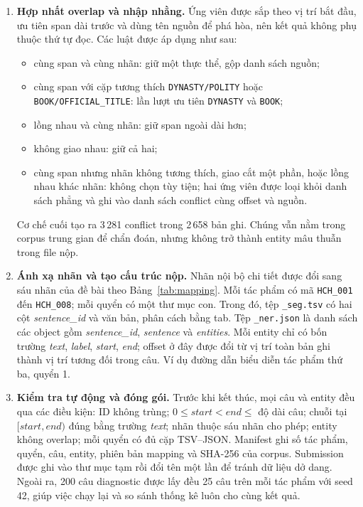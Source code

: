 \documentclass[11pt,a4paper]{article}
\begin{document}
\begin{enumerate}
  \item \textbf{Hợp nhất overlap và nhập nhằng.} Ứng viên được sắp theo vị trí
  bắt đầu, ưu tiên span dài trước và dùng tên nguồn để phá hòa, nên kết quả
  không phụ thuộc thứ tự đọc. Các luật được áp dụng như sau:
  \begin{itemize}
    \item cùng span và cùng nhãn: giữ một thực thể, gộp danh sách nguồn;
    \item cùng span với cặp tương thích \texttt{DYNASTY/POLITY} hoặc
    \texttt{BOOK/OFFICIAL\_TITLE}: lần lượt ưu tiên \texttt{DYNASTY} và
    \texttt{BOOK};
    \item lồng nhau và cùng nhãn: giữ span ngoài dài hơn;
    \item không giao nhau: giữ cả hai;
    \item cùng span nhưng nhãn không tương thích, giao cắt một phần, hoặc lồng
    nhau khác nhãn: không chọn tùy tiện; hai ứng viên được loại khỏi danh sách
    phẳng và ghi vào danh sách conflict cùng offset và nguồn.
  \end{itemize}
  Cơ chế cuối tạo ra 3\,281 conflict trong 2\,658 bản ghi. Chúng vẫn nằm trong
  corpus trung gian để chẩn đoán, nhưng không trở thành entity mâu thuẫn trong
  file nộp.

  \item \textbf{Ánh xạ nhãn và tạo cấu trúc nộp.} Nhãn nội bộ chi tiết được đổi
  sang sáu nhãn của đề bài theo Bảng~\ref{tab:mapping}. Mỗi tác phẩm có mã
  \texttt{HCH\_001} đến \texttt{HCH\_008}; mỗi quyển có một thư mục con. Trong
  đó, tệp \texttt{\_seg.tsv} có hai cột \emph{sentence\_id} và văn bản, phân
  cách bằng tab. Tệp \texttt{\_ner.json} là danh sách các object gồm
  \emph{sentence\_id}, \emph{sentence} và \emph{entities}. Mỗi entity chỉ có
  bốn trường \emph{text}, \emph{label}, \emph{start}, \emph{end}; offset ở
  đây được đổi từ vị trí toàn bản ghi thành vị trí tương đối trong câu. Ví dụ
  đường dẫn  biểu diễn tác phẩm thứ ba, quyển 1.

  \item \textbf{Kiểm tra tự động và đóng gói.} Trước khi kết thúc, mọi câu và
  entity đều qua các điều kiện: ID không trùng; $0\leq start<end\leq$ độ dài
  câu; chuỗi tại $[start,end)$ đúng bằng trường \emph{text}; nhãn thuộc sáu nhãn
  cho phép; entity không overlap; mỗi quyển có đủ cặp TSV--JSON. Manifest ghi
  số tác phẩm, quyển, câu, entity, phiên bản mapping và SHA-256 của corpus.
  Submission được ghi vào thư mục tạm rồi đổi tên một lần để tránh dữ liệu dở
  dang. Ngoài ra, 200 câu diagnostic được lấy đều 25 câu trên mỗi tác phẩm với
  seed 42, giúp việc chạy lại và so sánh thống kê luôn cho cùng kết quả.
\end{enumerate}
\end{document}
